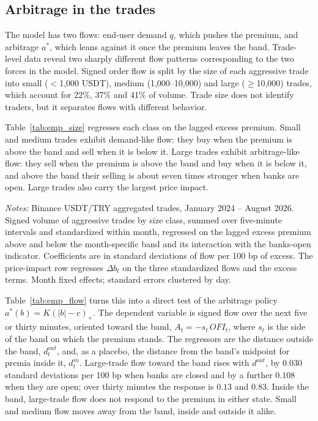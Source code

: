 \documentclass[12pt]{article}
\theoremstyle{definition}
\theoremstyle{remark}
\begin{document}
\subsection{Arbitrage in the trades}

The model has two flows: end-user demand $q$, which pushes the premium, and arbitrage $a^*$, which leans against it once the premium leaves the band. Trade-level data reveal two sharply different flow patterns corresponding to the two forces in the model. Signed order flow is split by the size of each aggressive trade into small ($<$1{,}000 USDT), medium (1{,}000--10{,}000) and large ($\ge$10{,}000) trades, which account for 22\%, 37\% and 41\% of volume. Trade size does not identify traders, but it separates flows with different behavior.

Table~\ref{tab:emp_size} regresses each class on the lagged excess premium. Small and medium trades exhibit demand-like flow: they buy when the premium is above the band and sell when it is below it. Large trades exhibit arbitrage-like flow: they sell when the premium is above the band and buy when it is below it, and above the band their selling is about seven times stronger when banks are open. Large trades also carry the largest price impact.

\begin{table}[t]
\centering
\caption{\textbf{Order flow by trade size and the excess premium}}
\label{tab:emp_size}
\footnotesize
\resizebox{\ifdim\width>\textwidth\textwidth\else\width\fi}{!}{}
\begin{minipage}{0.95\textwidth}
\footnotesize\vspace{4pt}
\emph{Notes:} Binance USDT/TRY aggregated trades, January 2024 -- August 2026. Signed volume of aggressive trades by size class, summed over five-minute intervals and standardized within month, regressed on the lagged excess premium above and below the month-specific band and its interaction with the banks-open indicator. Coefficients are in standard deviations of flow per 100 bp of excess. The price-impact row regresses $\Delta b_t$ on the three standardized flows and the excess terms. Month fixed effects; standard errors clustered by day.
\end{minipage}
\end{table}


Table~\ref{tab:emp_flow} turns this into a direct test of the arbitrage policy $a^*(b)=K(|b|-c)_+$. The dependent variable is signed flow over the next five or thirty minutes, oriented toward the band, $A_t=-s_t\,\mathit{OFI}_t$, where $s_t$ is the side of the band on which the premium stands. The regressors are the distance outside the band, $d^{out}_t$, and, as a placebo, the distance from the band's midpoint for premia inside it, $d^{in}_t$. Large-trade flow toward the band rises with $d^{out}$, by $0.030$ standard deviations per 100 bp when banks are closed and by a further $0.108$ when they are open; over thirty minutes the response is $0.13$ and $0.83$. Inside the band, large-trade flow does not respond to the premium in either state. Small and medium flow moves away from the band, inside and outside it alike.
\end{document}

